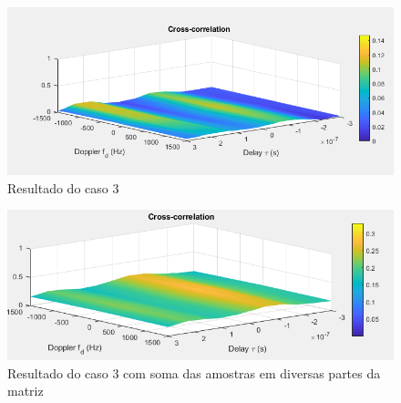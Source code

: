 \begin{figure}[h]
\centering
\includegraphics[scale=0.5]{chapters/ch5/assets/15mm}
\caption[Caso 3]{Resultado do caso 3}
\label{fig:15mm}
\end{figure}

\begin{figure}[h]
\centering
\includegraphics[scale=0.5]{chapters/ch5/assets/15mmsum}
\caption[Caso 3 especial]{Resultado do caso 3 com soma das amostras em diversas partes da matriz}
\label{fig:15mmsum}
\end{figure}